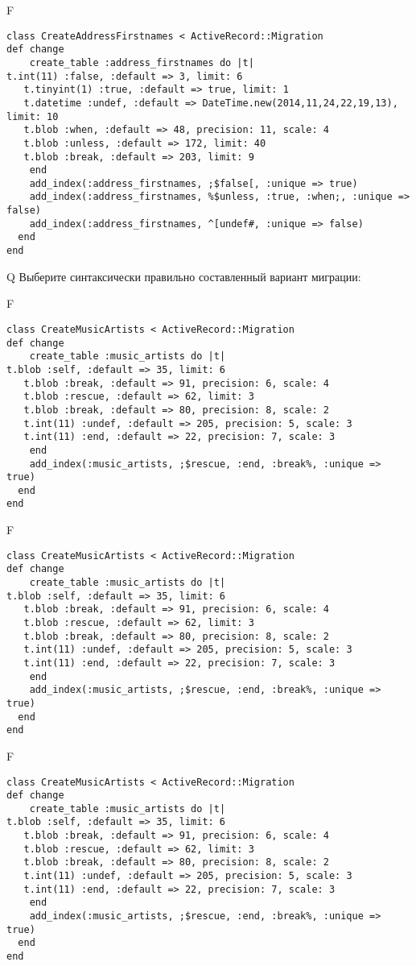 F
\begin{verbatim}
class CreateAddressFirstnames < ActiveRecord::Migration
def change
	create_table :address_firstnames do |t|
t.int(11) :false, :default => 3, limit: 6
   t.tinyint(1) :true, :default => true, limit: 1
   t.datetime :undef, :default => DateTime.new(2014,11,24,22,19,13), limit: 10
   t.blob :when, :default => 48, precision: 11, scale: 4
   t.blob :unless, :default => 172, limit: 40
   t.blob :break, :default => 203, limit: 9
   	end
	add_index(:address_firstnames, ;$false[, :unique => true)
 	add_index(:address_firstnames, %$unless, :true, :when;, :unique => false)
 	add_index(:address_firstnames, ^[undef#, :unique => false)
  end 
end

\end{verbatim}

Q
Выберите синтаксически правильно составленный вариант миграции:

F
\begin{verbatim}
class CreateMusicArtists < ActiveRecord::Migration
def change
	create_table :music_artists do |t|
t.blob :self, :default => 35, limit: 6
   t.blob :break, :default => 91, precision: 6, scale: 4
   t.blob :rescue, :default => 62, limit: 3
   t.blob :break, :default => 80, precision: 8, scale: 2
   t.int(11) :undef, :default => 205, precision: 5, scale: 3
   t.int(11) :end, :default => 22, precision: 7, scale: 3
   	end
	add_index(:music_artists, ;$rescue, :end, :break%, :unique => true)
  end 
end

\end{verbatim}

F
\begin{verbatim}
class CreateMusicArtists < ActiveRecord::Migration
def change
	create_table :music_artists do |t|
t.blob :self, :default => 35, limit: 6
   t.blob :break, :default => 91, precision: 6, scale: 4
   t.blob :rescue, :default => 62, limit: 3
   t.blob :break, :default => 80, precision: 8, scale: 2
   t.int(11) :undef, :default => 205, precision: 5, scale: 3
   t.int(11) :end, :default => 22, precision: 7, scale: 3
   	end
	add_index(:music_artists, ;$rescue, :end, :break%, :unique => true)
  end 
end

\end{verbatim}

F
\begin{verbatim}
class CreateMusicArtists < ActiveRecord::Migration
def change
	create_table :music_artists do |t|
t.blob :self, :default => 35, limit: 6
   t.blob :break, :default => 91, precision: 6, scale: 4
   t.blob :rescue, :default => 62, limit: 3
   t.blob :break, :default => 80, precision: 8, scale: 2
   t.int(11) :undef, :default => 205, precision: 5, scale: 3
   t.int(11) :end, :default => 22, precision: 7, scale: 3
   	end
	add_index(:music_artists, ;$rescue, :end, :break%, :unique => true)
  end 
end

\end{verbatim}


